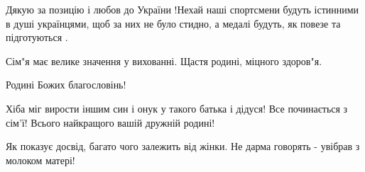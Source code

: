 \begin{itemize}
 

Дякую за позицію і любов до України !Нехай наші спортсмени будуть істинними в
душі українцями, щоб за них не було стидно, а медалі будуть, як повезе та
підготуються .


 
Сім"я має велике значення у вихованні. Щастя родині, міцного здоров"я.

 
Родині Божих благословінь!

 
Хіба міг вирости іншим син і онук у такого батька і дідуся! Все починається з сім'ї! Всього найкращого вашій дружній родині!

\begin{itemize}
 
Як показує досвід, багато чого залежить від жінки. Не дарма говорять - увібрав з молоком матері!

\begin{itemize}
 

\end{itemize}
\end{itemize}
\end{itemize}
